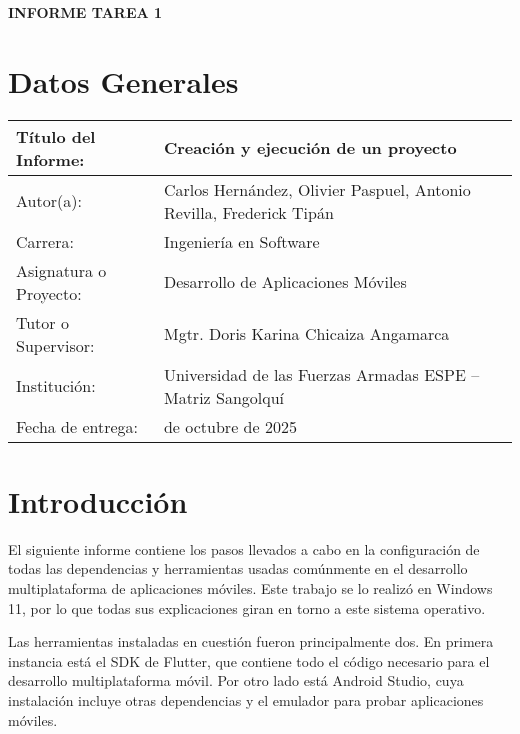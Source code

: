 \documentclass[12pt,letterpaper]{article}
\begin{document}
\renewcommand{\figurename}{Ilustración} 
{\textbf{\textcolor{azulOscuro}{INFORME TAREA 1}}}


{\setlength{\parskip}{0pt}
\section{Datos Generales}
}

\begin{tabularx}{\textwidth}{|>{\raggedright\arraybackslash}X|>{\raggedright\arraybackslash}X|}
\hline
Título del Informe: & Creación y ejecución de un proyecto \\
\hline
Autor(a): & Carlos Hernández, Olivier Paspuel, Antonio Revilla, Frederick Tipán\\
\hline
Carrera: & Ingeniería en Software \\
\hline
Asignatura o Proyecto: & Desarrollo de Aplicaciones Móviles \\
\hline
Tutor o Supervisor: & Mgtr. Doris Karina Chicaiza Angamarca\\
\hline
Institución: & Universidad de las Fuerzas Armadas ESPE – Matriz Sangolquí \\
\hline
Fecha de entrega: & 23 de octubre de 2025 \\
\hline
\end{tabularx}



\section{Introducción}
El siguiente informe contiene los pasos llevados a cabo en la configuración de todas las dependencias y herramientas usadas comúnmente en el desarrollo multiplataforma de aplicaciones móviles. Este trabajo se lo realizó en Windows 11, por lo que todas sus explicaciones giran en torno a este sistema operativo.

Las herramientas instaladas en cuestión fueron principalmente dos. En primera instancia está el SDK de Flutter, que contiene todo el código necesario para el desarrollo multiplataforma móvil. Por otro lado está Android Studio, cuya instalación incluye otras dependencias y el emulador para probar aplicaciones móviles.
\end{document}
